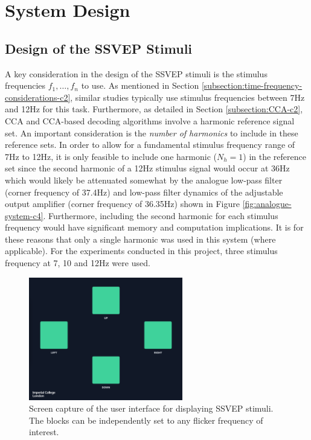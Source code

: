 \chapter{System Design}
\label{chapter:system-design}

\graphicspath{ {report/C5 System Design/assets/} } 

\section{Design of the SSVEP Stimuli}
\label{subsection:ssvep-stimuli}
A key consideration in the design of the SSVEP stimuli is the stimulus frequencies $f_1, \dots, f_n$ to use. As mentioned in Section \ref{subsection:time-frequency-considerations-c2}, similar studies typically use stimulus frequencies between 7Hz and 12Hz for this task. Furthermore, as detailed in Section \ref{subsection:CCA-c2}, CCA and CCA-based decoding algorithms involve a harmonic reference signal set. An important consideration is the \textit{number of harmonics} to include in these reference sets. In order to allow for a fundamental stimulus frequency range of 7Hz to 12Hz, it is only feasible to include one harmonic ($N_h=1$) in the reference set since the second harmonic of a 12Hz stimulus signal would occur at 36Hz which would likely be attenuated somewhat by the analogue low-pass filter (corner frequency of 37.4Hz) and low-pass filter dynamics of the adjustable output amplifier (corner frequency of 36.35Hz) shown in Figure \ref{fig:analogue-system-c4}. Furthermore, including the second harmonic for each stimulus frequency would have significant memory and computation implications. It is for these reasons that only a single harmonic was used in this system (where applicable). For the experiments conducted in this project, three stimulus frequency at 7, 10 and 12Hz were used. 

\begin{figure}[!htb]
    \centering
    \includegraphics[width=0.6\textwidth]{ssvep-squares}
    \caption{Screen capture of the user interface for displaying SSVEP stimuli. The blocks can be independently set to any flicker frequency of interest.}
    \label{fig:ssvep-squares-c5}
\end{figure}

